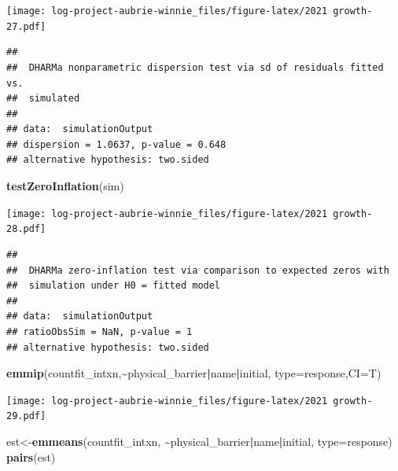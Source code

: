 \documentclass[
]{article}
\newenvironment{Shaded}{\begin{snugshade}}{\end{snugshade}}
\newcommand{\AttributeTok}[1]{\textcolor[rgb]{0.13,0.29,0.53}{#1}}
\newcommand{\FunctionTok}[1]{\textcolor[rgb]{0.13,0.29,0.53}{\textbf{#1}}}
\newcommand{\NormalTok}[1]{#1}
\newcommand{\OtherTok}[1]{\textcolor[rgb]{0.56,0.35,0.01}{#1}}
\newcommand{\SpecialCharTok}[1]{\textcolor[rgb]{0.81,0.36,0.00}{\textbf{#1}}}
\newcommand{\StringTok}[1]{\textcolor[rgb]{0.31,0.60,0.02}{#1}}
\begin{document}
\texttt{[image: log-project-aubrie-winnie\_files/figure-latex/2021 growth-27.pdf]}

\begin{verbatim}
## 
##  DHARMa nonparametric dispersion test via sd of residuals fitted vs.
##  simulated
## 
## data:  simulationOutput
## dispersion = 1.0637, p-value = 0.648
## alternative hypothesis: two.sided
\end{verbatim}

\begin{Shaded}
\begin{Highlighting}[]
\FunctionTok{testZeroInflation}\NormalTok{(sim)}
\end{Highlighting}
\end{Shaded}

\texttt{[image: log-project-aubrie-winnie\_files/figure-latex/2021 growth-28.pdf]}

\begin{verbatim}
## 
##  DHARMa zero-inflation test via comparison to expected zeros with
##  simulation under H0 = fitted model
## 
## data:  simulationOutput
## ratioObsSim = NaN, p-value = 1
## alternative hypothesis: two.sided
\end{verbatim}

\begin{Shaded}
\begin{Highlighting}[]
\FunctionTok{emmip}\NormalTok{(countfit\_intxn,}\SpecialCharTok{\textasciitilde{}}\NormalTok{physical\_barrier}\SpecialCharTok{|}\NormalTok{name}\SpecialCharTok{|}\NormalTok{initial, }\AttributeTok{type=}\StringTok{\textquotesingle{}response\textquotesingle{}}\NormalTok{,}\AttributeTok{CI=}\NormalTok{T)}
\end{Highlighting}
\end{Shaded}

\texttt{[image: log-project-aubrie-winnie\_files/figure-latex/2021 growth-29.pdf]}

\begin{Shaded}
\begin{Highlighting}[]
\NormalTok{est}\OtherTok{\textless{}{-}}\FunctionTok{emmeans}\NormalTok{(countfit\_intxn, }\SpecialCharTok{\textasciitilde{}}\NormalTok{physical\_barrier}\SpecialCharTok{|}\NormalTok{name}\SpecialCharTok{|}\NormalTok{initial, }\AttributeTok{type=}\StringTok{\textquotesingle{}response\textquotesingle{}}\NormalTok{)}
\FunctionTok{pairs}\NormalTok{(est)}
\end{Highlighting}
\end{Shaded}
\end{document}
